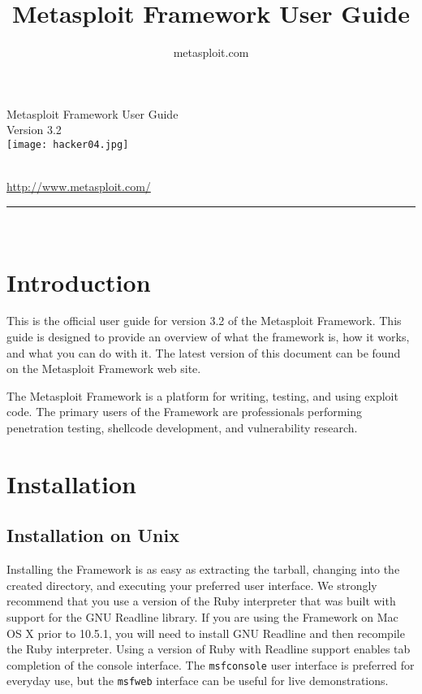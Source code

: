 \documentclass{report}
\begin{document}
\title{Metasploit Framework User Guide}
\author{metasploit.com}

\begin{titlepage}
    \begin{center}
        		
        \huge{Metasploit Framework User Guide}
		\ \\[10mm]
		\large{Version 3.2}
		\\[10mm]

		\texttt{[image: hacker04.jpg]}
		
		\ \\[10mm]
		
        \small{\url{http://www.metasploit.com/}}

        \rule{10cm}{1pt} \\[4mm]
        \renewcommand{\arraystretch}{0.5}
    \end{center}
\end{titlepage}

\tableofcontents

\setlength{\parindent}{0pt} \setlength{\parskip}{8pt}


\chapter{Introduction}

\par
This is the official user guide for version 3.2 of the Metasploit Framework. This 
guide is designed to provide an overview of what the framework is, how it works,
and what you can do with it. The latest version of this document can be found
on the Metasploit Framework web site. 

\par
The Metasploit Framework is a platform for writing, testing, and using exploit code.
The primary users of the Framework are professionals performing penetration testing,
shellcode development, and vulnerability research.

\par
\pagebreak

\chapter{Installation}

    \section{Installation on Unix}
    \label{INSTALL-UNIX}
\par
Installing the Framework is as easy as extracting the tarball, changing into the
created directory, and executing your preferred user interface. We strongly
recommend that you use a version of the Ruby interpreter that was built with
support for the GNU Readline library. If you are using the Framework on Mac OS
X prior to 10.5.1, you will need to install GNU Readline and then recompile the Ruby
interpreter.  Using a version of Ruby with Readline support enables tab completion
of the console interface.  The \texttt{msfconsole} user interface is preferred for everyday
use, but the \texttt{msfweb} interface can be useful for live demonstrations.
\end{document}
